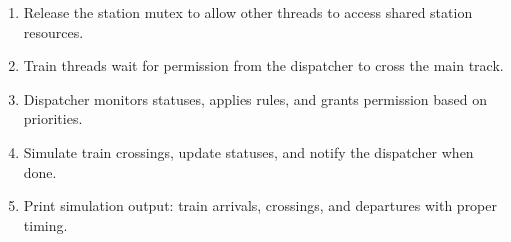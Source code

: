 \documentclass[10pt]{article}
\begin{document}
\begin{enumerate}
\begin{enumerate}
            \item Release the station mutex to allow other threads to access shared station resources.
            \item Train threads wait for permission from the dispatcher to cross the main track.
            \item Dispatcher monitors statuses, applies rules, and grants permission based on priorities.
            \item Simulate train crossings, update statuses, and notify the dispatcher when done.
            \item Print simulation output: train arrivals, crossings, and departures with proper timing.
        \end{enumerate}
\end{enumerate}
\end{document}
